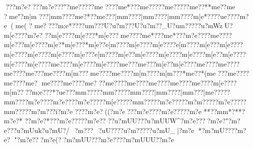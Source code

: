 {{{{{{{{{{{{{{{{{{{{{{{{{{{{{{{{{{{{{{{{{{{{{{{{{{{{{{{{{{{{{{{{{{{{{{{{{{{{{{{{{{{{{{{{{{{{{{{{{{{{{{{{{{{{{{{{{{{{{{{{{{{{{{{{{{{{{{{{{{{{{{{{{{{{{{{{{{{{{{{{{{{{{{{{{{{{{{{{{{{{{{{{{{{{{{{{{{{{{{{{{{{{{{{{{{{{{{{{{{{{{{{{{{{{{{{{{{{{{{{{{{{{{{{{{{{{{{{{{{{{{{{{{{{{{{{{{{{{{{{{{{{{{{{{{{{{{{{{{{{{{{{{{{{{{{{{{{{{{{{{{{{{{{{{{{{{{{{{{{{{{{{{{{{{{{{{{{{{{{{{{{{{{{{{{{{{{{{{{{{{{{{{{{{{{{{{{{{{{{{{{{{{{{{{{{{{{{{{{{{{{{{{{{{{{{{{{{{{{{{{{{{{{{{{{{{{{{{{{{{{{{{{{{{{{{{{{{{{{{{{{{{{{{{{{{{{{{{{{{{{{{{{{{{{{{{{{{{{{{{{{{{{{{{{{{{{{{{{{{{{{{{{{{{{{{{{{{{{{{{{{{{{{{{{{{{{{{{{{{{{{{{{{{{{{{{{{{{{{{{{{{{{{{{{{{{{{{{{{{{{{{{{{{{{{{{{{{{{{{{{{{{{{{{{{{{{{{{{{{{{{{{{{{{{{{{{{{{{{{{{{{{{{{{{{{{{{{{{{{{{{{{{{{{{{{{{{{{{{{{{{{{{{{{{{{{{{{{{{{{{{{{{{{{{{{{{{{{{{{{{{{{{{{{{{{{{{{{{{{{{{{{{{{{{{{{{{{{{{{{{{{{{{{{{{{{{{{{{{{{{{{{{{{{{{{{{{{{{{{{{{{{{{{{{{{{{{{{{{{{{{{{{{{{{{{{{{{{{{{{{{{{{{{{{{{{{{{{{{{{{{{{{{{{{{{{{{{{{{{{{{{{{{{{{{{{{{{{{{{{{{{{{{{{{{{{{{{{{{{{{{{{{{{{{{{{{{{{{{{{{{{{{{{{{{{{{{{{{{{{{{{{{{{{{{{{{{{{{{{{{{{{{{{{{{{{{{{{{{{{{{{{{{{{{{{{{{{{{{{{{{{{{{{{{{{{{{{{{{{{{{{{{{{{{{{{{{{{{{{{{{{{{{{{{{{{{{{{{{{{{{{{{{{{{{{{{{{{{{{{{{{{{{{{{{{{{{{{{{{{{{{{{{{{{{{{{{{{{{{{{{{{{{{{{{{{{{{{{{{{{{{{{{{{{{{{{{{{{{{{{{{{{{{{{{{{{{{{{{{{{{{{{{{{{{{{{{{{{{{{{{{{{{{{{{{{{{{{{{{{{{{{{{{{{{{{{{{{{{{{{{{{{{{{{{{{{{{{{{{{{{{{{{{{{{{{{{{{{{{{{{{{{{{{{{{{{{{{{{{{{{{{{{{{{{{{{{{{{{{{{{{{{{{{{{{{{{{{{{{{{{{{{{{{{{{{{{{{{{{{{{{{{{{{{{{{{{{{{{{{{{{{{{{{{{{{{{{{{{{{{{{{{{{{{{{{{{{{{{{{{{{{{{{{{{{{{{{{{{{{{{{{{{{{{{{{{{{{{{{{{{{{{{{{{{{{{{{{{{{{{{{{{{{{{{{{{{{{{{{{{{{{{{{{{{{{{{{{{{{{{{{{{{{{{{{{{{{{{{{{{{{{{{{{{{{{{{{{{{{{{{{{{{{{{{{{{{{{{{{{{{{{{{{{{{{{{{{{{{{{{{{{{{{{{{{{{{{{{{{{{{{{{{{{{{{{{{{{{{{{{{{{{{{{{{{{{{{{{{{{{{{{{{{{{{{{{{{{{{{{{{{{{{{{{{{{{{{{{{{{{{{{{{{{{{{{{{{{{{{{{{{{{{{{{{{{{{{{{{{{{{{{{{{{{{{{{{{{{{{{{{{{{{{{{{{{{{{{{{{{{{{{{{{{{{{{{{{{{{{{{{{{{{{{{{{{{{{{{{{{{{{{{{{{{{{{{{{{{{{{{{{{{{{{{{{{{{{{{{{{{{{{{{{{{{{{{{{{{{{{{{{{{{{{{{{{{{{{{{{{{{{{{{{{{{{{{{{{{{{{{{{{{{{{{{{{{{{{{{{{{{{{{{{{{{{{{{{{{{{{{{{{{{{{{{{{{{{{{{{{{{{{{{{{{{{{{{{{{{{{{{{{{{???m?e????m?e???"?m{e?????m{e
????m{e *???m{e?????m{e?????m{e??**{m{e ?? {m{e 
?{m{e "? {m|m
???|m{m????{m{e?*??{m{e ???|m{m????|m{m????|m{m????{m|e*????u{e????{m?e({m{e(
? {m{e????m;e*????u{m???U?u?m???U?u?m??_U?u{m?????u?mWzU?m[e????{m?e?
??{m[e????{m[e???*{m[e???{m{e????{m{e*???{m{e*???{m?e????{m{e????{m[e??? {m[e????{m[e?*{m[e???*{m[e??{e[m????{m[e????{m[e????{e[m????{m[e???{m[e????{m[e????{m[e????{m[e????{m[e???{e[m????{m[e??{m[e????{m[e????{m[e????{m[e??{m[e????{m[e????{m[e????{m{e????{m[e????{m[e????{m{e???{m{e???{m[e??{m[e????{m{e????{m{e????{m{e????{m{e???{m{e????{m[m???{m{e????{m{e????{m[m????{m[m???*{m{e??*({m{e ???{m{e????{m{e????{m{e?  {m{e????{m{e????{m{e?
??{m{e????{m{e????{m{e????{m{e????{m{e????{m[e????{m[m????m;e???*?u{e???m{m?????m{m?????m{m????|m{m????|m{m???|m{e?????m{m????{m?e????{m?e????{m?e?????m[e?????m{m?????m?e?????m?m?????m?e?????m{m?????m?m???i?m?e
????m?e?((?m?e ???m?e??? ?m?e?????m?e
**??m{m*?**?m?e?*
??m?e?*???m?e?????m?e?? ??u?mUU???u?mUUW^?m?e????m?e?"  ?m?e??  ?u?mUu}k?u?mU?/~?m???~?uU????u?m?????u?mU_|?m?e
 *?m?mU????m?e?
"?m?e?? ?m?e( ??m?mUU???m?e? ???m?mUUU??m?e }}}}}}}}}}}}}}}}}}}}}}}}}}}}}}}}}}}}}}}}}}}}}}}}}}}}}}}}}}}}}}}}}}}}}}}}}}}}}}}}}}}}}}}}}}}}}}}}}}}}}}}}}}}}}}}}}}}}}}}}}}}}}}}}}}}}}}}}}}}}}}}}}}}}}}}}}}}}}}}}}}}}}}}}}}}}}}}}}}}}}}}}}}}}}}}}}}}}}}}}}}}}}}}}}}}}}}}}}}}}}}}}}}}}}}}}}}}}}}}}}}}}}}}}}}}}}}}}}}}}}}}}}}}}}}}}}}}}}}}}}}}}}}}}}}}}}}}}}}}}}}}}}}}}}}}}}}}}}}}}}}}}}}}}}}}}}}}}}}}}}}}}}}}}}}}}}}}}}}}}}}}}}}}}}}}}}}}}}}}}}}}}}}}}}}}}}}}}}}}}}}}}}}}}}}}}}}}}}}}}}}}}}}}}}}}}}}}}}}}}}}}}}}}}}}}}}}}}}}}}}}}}}}}}}}}}}}}}}}}}}}}}}}}}}}}}}}}}}}}}}}}}}}}}}}}}}}}}}}}}}}}}}}}}}}}}}}}}}}}}}}}}}}}}}}}}}}}}}}}}}}}}}}}}}}}}}}}}}}}}}}}}}}}}}}}}}}}}}}}}}}}}}}}}}}}}}}}}}}}}}}}}}}}}}}}}}}}}}}}}}}}}}}}}}}}}}}}}}}}}}}}}}}}}}}}}}}}}}}}}}}}}}}}}}}}}}}}}}}}}}}}}}}}}}}}}}}}}}}}}}}}}}}}}}}}}}}}}}}}}}}}}}}}}}}}}}}}}}}}}}}}}}}}}}}}}}}}}}}}}}}}}}}}}}}}}}}}}}}}}}}}}}}}}}}}}}}}}}}}}}}}}}}}}}}}}}}}}}}}}}}}}}}}}}}}}}}}}}}}}}}}}}}}}}}}}}}}}}}}}}}}}}}}}}}}}}}}}}}}}}}}}}}}}}}}}}}}}}}}}}}}}}}}}}}}}}}}}}}}}}}}}}}}}}}}}}}}}}}}}}}}}}}}}}}}}}}}}}}}}}}}}}}}}}}}}}}}}}}}}}}}}}}}}}}}}}}}}}}}}}}}}}}}}}}}}}}}}}}}}}}}}}}}}}}}}}}}}}}}}}}}}}}}}}}}}}}}}}}}}}}}}}}}}}}}}}}}}}}}}}}}}}}}}}}}}}}}}}}}}}}}}}}}}}}}}}}}}}}}}}}}}}}}}}}}}}}}}}}}}}}}}}}}}}}}}}}}}}}}}}}}}}}}}}}}}}}}}}}}}}}}}}}}}}}}}}}}}}}}}}}}}}}}}}}}}}}}}}}}}}}}}}}}}}}}}}}}}}}}}}}}}}}}}}}}}}}}}}}}}}}}}}}}}}}}}}}}}}}}}}}}}}}}}}}}}}}}}}}}}}}}}}}}}}}}}}}}}}}}}}}}}}}}}}}}}}}}}}}}}}}}}}}}}}}}}}}}}}}}}}}}}}}}}}}}}}}}}}}}}}}}}}}}}}}}}}}}}}}}}}}}}}}}}}}}}}}}}}}}}}}}}}}}}}}}}}}}}}}}}}}}}}}}}}}}}}}}}}}}}}}}}}}}}}}}}}}}}}}}}}}}}}}}}}}}}}}}}}}}}}}}}}}}}}}}}}}}}}}}}}}}}}}}}}}}}}}}}}}}}}}}}}}}}}}}}}}}}}}}}}}}}}}}}}}}}}}}}}}}}}}}}}}}}}}}}}}}}}}}}}}}}}}}}}}}}}}}}}}}}}}}}}}}}}}}}}}}}}}}}}}}}}}}}}}}}}}}}}}}}}}}}}}}}}}}}}}}}}}}}}}}}}}}}}}}}}}}}}}}}}}}}}}}}}}}}}}}}}}}}}}}}}}}}}}}}}}}}}}}}}}}}}}}}}}}}}}}}}}}}}}}}}}}}}}}}}}}}}}}}}}}}}}}}}}}}}}}}}}}}}}}}}}}}}}}}}}}}}}}}}}}}}}}}}}}}}}}}}}}}}}}}}}}}}}}}}}}}}}}}}}}}}}}}}}}}}}}}}}}}}}}}}}}}}}}}}}}}}}}}}}}}}}}}}}}}}}}}}}}}}}}}}}}}}}}}}}}}}}}}}}}}}}}}}}}}}}}}}}}}}}}}}}}}}}}}}}}}}}}}}}}}}}}}}}}}}}}}}}}}}}}}}}}}}}}}}}}}}}}}}}}}}}}}}}}}}}}}}}}}}}}}}}}}}}}}}}}}}}}}}}}}}}}}}}}}}}}}}}}}}}}}}}}}}}}}}}}}}}}}}}}}}}}}}}}}}}}}}}}}}}}}}}}}}}}}}}}}}}}}}}}}}}}}}}}}}}}}}}}}}}}}}}}}}}}}}}}}}}}}
